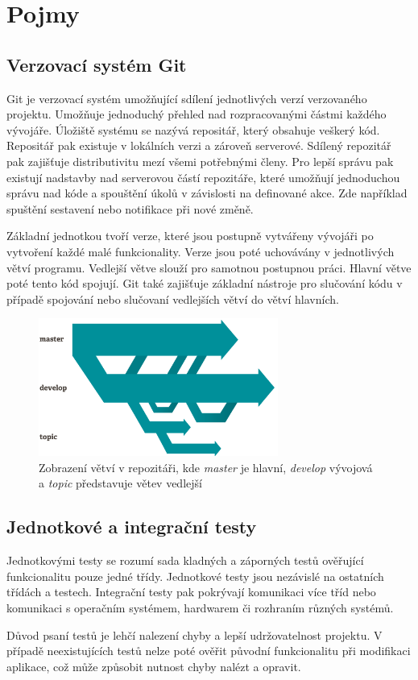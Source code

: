 \documentclass[thesis=B,czech]{FITthesis}[2012/06/26]
\begin{document}
\section{Pojmy}

\subsection{Verzovací systém Git}
Git \cite{GIT} je verzovací systém umožňující sdílení jednotlivých verzí verzovaného projektu.
Umožňuje jednoduchý přehled nad rozpracovanými částmi každého vývojáře. Úložiště systému se nazývá repositář, který obsahuje veškerý kód.
Repositář pak existuje v lokálních verzi a zároveň serverové. Sdílený repozitář pak zajišťuje distributivitu mezí všemi
potřebnými členy. Pro lepší správu pak existují nadstavby nad serverovou částí repozitáře, které umožňují jednoduchou
správu nad kóde a spouštění úkolů v závislosti na definované akce. Zde například spuštění sestavení nebo notifikace
při nové změně.
\par
Základní jednotkou tvoří verze, které jsou postupně vytvářeny vývojáři po vytvoření každé malé funkcionality.
Verze jsou poté uchovávány v jednotlivých větví programu. Vedlejší větve slouží pro samotnou postupnou práci. 
Hlavní větve poté tento kód spojují. Git také zajišťuje základní nástroje pro slučování kódu v případě spojování 
nebo slučovaní vedlejších větví do větví hlavních.

\newpage

\begin{figure}[h]\centering
 	\includegraphics[width=0.7\textwidth]{resources/branches}
	\caption[Větve v Git repozitáři]{Zobrazení větví v repozitáři, kde \textit{master} je hlavní, \textit{develop} vývojová a \textit{topic}
	představuje větev vedlejší}\label{fig:vetev}
\end{figure}

\subsection{Jednotkové a integrační testy}
Jednotkovými testy se rozumí sada kladných a záporných testů ověřující funkcionalitu pouze jedné třídy. Jednotkové testy
jsou nezávislé na ostatních třídách a testech. \cite{testing} 
Integrační testy pak pokrývají komunikaci více tříd nebo komunikaci s operačním systémem, hardwarem či rozhraním různých systémů. \cite{testing}
\par
Důvod psaní testů je lehčí nalezení chyby a lepší udržovatelnost projektu. V případě neexistujících testů nelze poté ověřit původní
funkcionalitu při modifikaci aplikace, což může způsobit nutnost chyby nalézt a opravit.\cite{testing}
\end{document}
